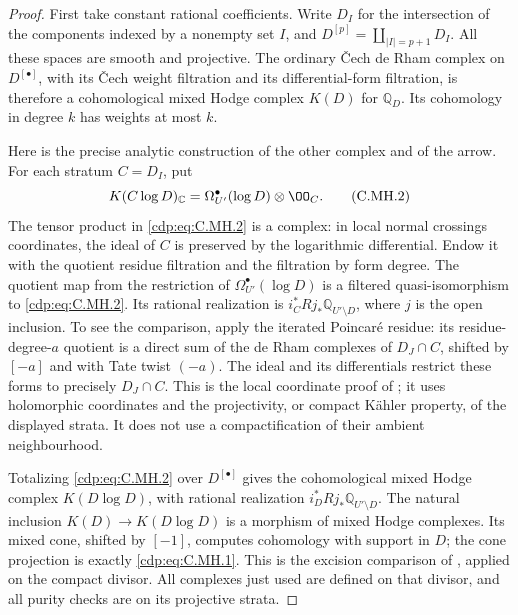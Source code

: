 \begin{proof}
First take constant rational coefficients. Write $D_I$
for the intersection of the components indexed by a
nonempty set $I$, and $D^{[p]}=\coprod_{|I|=p+1}D_I$.
All these spaces are smooth and projective. The ordinary
\v Cech de Rham complex on $D^{[\bullet]}$, with its
\v Cech weight filtration and its differential-form
filtration, is therefore a cohomological mixed Hodge
complex $K(D)$ for $\mathbb Q_D$. Its cohomology in
degree $k$ has weights at most $k$.

Here is the precise analytic construction of the other
complex and of the arrow. For each stratum $C=D_I$, put
\[
 K(C\log D)_{\mathbb C}
   =\Omega_{U'}^\bullet(\log D)\otimes\OO_C.
 \tag{C.MH.2}\label{cdp:eq:C.MH.2}
\]
The tensor product in \eqref{cdp:eq:C.MH.2} is a complex: in local
normal crossings coordinates, the ideal of $C$ is
preserved by the logarithmic differential. Endow it with
the quotient residue filtration and the filtration by
form degree. The quotient map from the restriction of
$\Omega_{U'}^\bullet(\log D)$ is a filtered
quasi-isomorphism to \eqref{cdp:eq:C.MH.2}. Its rational realization is
$i_C^*Rj_*\mathbb Q_{U'\setminus D}$, where $j$ is the
open inclusion. To see the comparison, apply the
iterated Poincar\'e residue: its residue-degree-$a$
quotient is a direct sum of the de Rham complexes of
$D_J\cap C$, shifted by $[-a]$ and with Tate twist
$(-a)$. The ideal and its differentials restrict these
forms to precisely $D_J\cap C$. This is the local
coordinate proof of \cite[Section~3, Theorem~1 and
Corollary~2]{Steenbrink1999}; it uses holomorphic
coordinates and the projectivity, or compact K\"ahler
property, of the displayed strata. It does not use a
compactification of their ambient neighbourhood.

Totalizing \eqref{cdp:eq:C.MH.2} over $D^{[\bullet]}$ gives the
cohomological mixed Hodge complex $K(D\log D)$, with
rational realization $i_D^*Rj_*\mathbb Q_{U'\setminus D}$.
The natural inclusion $K(D)\to K(D\log D)$ is a
morphism of mixed Hodge complexes. Its mixed cone,
shifted by $[-1]$, computes cohomology with support in
$D$; the cone projection is exactly \eqref{cdp:eq:C.MH.1}. This is
the excision comparison of
\cite[Section~4, equation~(3)]{Steenbrink1999}, applied
on the compact divisor. All complexes just used are
defined on that divisor, and all purity checks are on
its projective strata.


\end{proof}
